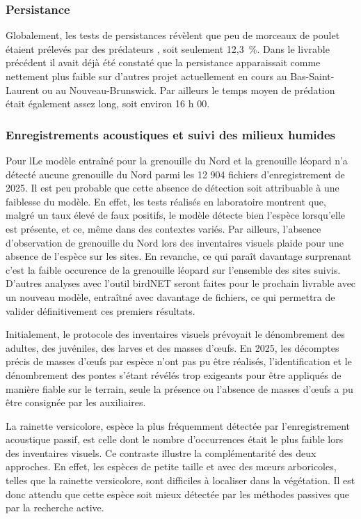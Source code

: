 \subsubsection{Persistance}

Globalement, les tests de persistances révèlent que peu de morceaux de poulet étaient prélevés par des prédateurs , soit seulement 12,3~\%. Dans le livrable précédent il avait déjà été constaté que la persistance apparaissait comme nettement plus faible sur d'autres projet actuellement en cours au Bas-Saint-Laurent ou au Nouveau-Brunswick. Par ailleurs le temps moyen de prédation était également assez long, soit environ 16 h 00.

\subsubsection{Enregistrements acoustiques et suivi des milieux humides}

Pour lLe modèle entraîné pour la grenouille du Nord et la grenouille léopard n'a détecté aucune grenouille du Nord parmi les 12 904 fichiers d'enregistrement de 2025. Il est peu probable que cette absence de détection soit attribuable à une faiblesse du modèle. En effet, les tests réalisés en laboratoire montrent que, malgré un taux élevé de faux positifs, le modèle détecte bien l'espèce lorsqu'elle est présente, et ce, même dans des contextes variés. Par ailleurs, l'absence d'observation de grenouille du Nord lors des inventaires visuels plaide pour une absence de l'espèce sur les sites. En revanche, ce qui paraît davantage surprenant c'est la faible occurence de la grenouille léopard sur l'ensemble des sites suivis. D'autres analyses avec l'outil birdNET seront faites pour le prochain livrable avec un nouveau modèle, entraîtné avec davantage de fichiers, ce qui permettra de valider définitivement ces premiers résultats. 

Initialement, le protocole des inventaires visuels prévoyait le dénombrement des adultes, des juvéniles, des larves et des masses d'\oe{}ufs. En 2025, les décomptes précis de masses d'\oe{}ufs par espèce n'ont pas pu être réalisés, l'identification et le dénombrement des pontes s'étant révélés trop exigeants pour être appliqués de manière fiable sur le terrain, seule la présence ou l'absence de masses d'\oe{}ufs a pu être consignée par les auxiliaires.

La rainette versicolore, espèce la plus fréquemment détectée par l'enregistrement acoustique passif, est celle dont le nombre d'occurrences était le plus faible lors des inventaires visuels. Ce contraste illustre la complémentarité des deux approches. En effet, les espèces de petite taille et avec des m\oe{}urs arboricoles, telles que la rainette versicolore, sont difficiles à localiser dans la végétation. Il est donc attendu que cette espèce soit mieux détectée par les méthodes passives que par la recherche active.

